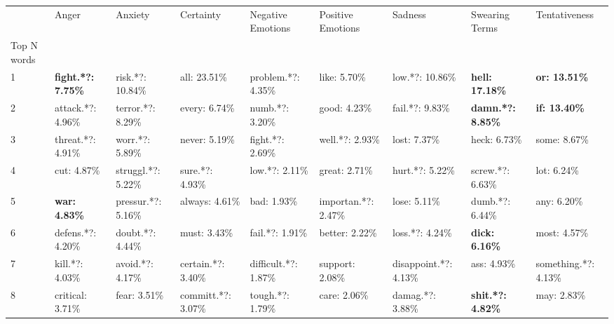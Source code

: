 \begin{tabular}{lllllllll}
\toprule
{} &                      Anger &               Anxiety &              Certainty &     Negative Emotions &    Positive Emotions &                Sadness &            Swearing Terms &         Tentativeness \\
Top N words          &                            &                       &                        &                       &                      &                        &                           &                       \\
\midrule
1                    &  \textbf{fight.*?: 7.75\%} &      risk.*?: 10.84\% &           all: 23.51\% &    problem.*?: 4.35\% &         like: 5.70\% &        low.*?: 10.86\% &    \textbf{hell: 17.18\%} &  \textbf{or: 13.51\%} \\
2                    &          attack.*?: 4.96\% &     terror.*?: 8.29\% &          every: 6.74\% &       numb.*?: 3.20\% &         good: 4.23\% &        fail.*?: 9.83\% &  \textbf{damn.*?: 8.85\%} &  \textbf{if: 13.40\%} \\
3                    &          threat.*?: 4.91\% &       worr.*?: 5.89\% &          never: 5.19\% &      fight.*?: 2.69\% &      well.*?: 2.93\% &           lost: 7.37\% &              heck: 6.73\% &          some: 8.67\% \\
4                    &                cut: 4.87\% &    struggl.*?: 5.22\% &        sure.*?: 4.93\% &        low.*?: 2.11\% &        great: 2.71\% &        hurt.*?: 5.22\% &          screw.*?: 6.63\% &           lot: 6.24\% \\
5                    &       \textbf{war: 4.83\%} &    pressur.*?: 5.16\% &         always: 4.61\% &           bad: 1.93\% &  importan.*?: 2.47\% &           lose: 5.11\% &           dumb.*?: 6.44\% &           any: 6.20\% \\
6                    &          defens.*?: 4.20\% &      doubt.*?: 4.44\% &           must: 3.43\% &       fail.*?: 1.91\% &       better: 2.22\% &        loss.*?: 4.24\% &     \textbf{dick: 6.16\%} &          most: 4.57\% \\
7                    &            kill.*?: 4.03\% &      avoid.*?: 4.17\% &     certain.*?: 3.40\% &  difficult.*?: 1.87\% &      support: 2.08\% &  disappoint.*?: 4.13\% &               ass: 4.93\% &  something.*?: 4.13\% \\
8                    &           critical: 3.71\% &          fear: 3.51\% &     committ.*?: 3.07\% &      tough.*?: 1.79\% &         care: 2.06\% &       damag.*?: 3.88\% &  \textbf{shit.*?: 4.82\%} &           may: 2.83\% \\

\end{tabular}
